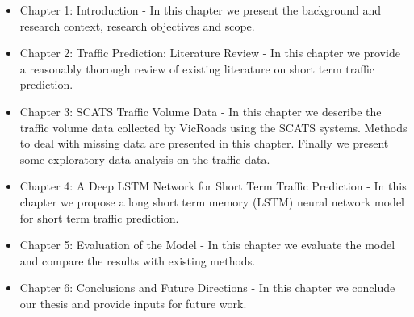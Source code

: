 \begin{itemize}
\item Chapter 1: Introduction - In this chapter we present the background and research context,
research objectives and scope.

\item Chapter 2: Traffic Prediction: Literature Review - In this chapter we provide a reasonably
thorough review of existing literature on short term traffic prediction.

\item Chapter 3: SCATS Traffic Volume Data - In this chapter we describe the traffic volume data
collected by VicRoads using the SCATS systems. Methods to deal with missing data are presented in
this chapter. Finally we present some exploratory data analysis on the traffic data.

\item Chapter 4: A Deep LSTM Network for Short Term Traffic Prediction - In this chapter we propose
a long short term memory (LSTM) neural network model for short term traffic prediction.

\item Chapter 5: Evaluation of the Model - In this chapter we evaluate the model and compare the results
with existing methods.

\item Chapter 6: Conclusions and Future Directions - In this chapter we conclude our thesis and
provide inputs for future work.
\end{itemize}
